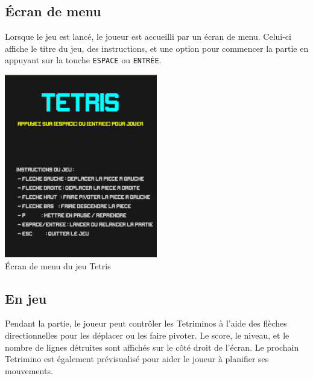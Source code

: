 \documentclass[12pt,a4paper]{report}
\begin{document}
\subsection{Écran de menu}
Lorsque le jeu est lancé, le joueur est accueilli par un écran de menu. Celui-ci affiche le titre du jeu, des instructions, et une option pour commencer la partie en appuyant sur la touche \texttt{ESPACE} ou \texttt{ENTRÉE}.

\begin{center}
    \includegraphics[width=0.5\textwidth]{Figure_Menu.png}
    \\
    \caption{Écran de menu du jeu Tetris}
    \label{fig:menu}
\end{center}

\subsection{En jeu}
Pendant la partie, le joueur peut contrôler les Tetriminos à l'aide des flèches directionnelles pour les déplacer ou les faire pivoter. Le score, le niveau, et le nombre de lignes détruites sont affichés sur le côté droit de l'écran. Le prochain Tetrimino est également prévisualisé pour aider le joueur à planifier ses mouvements.
\end{document}
